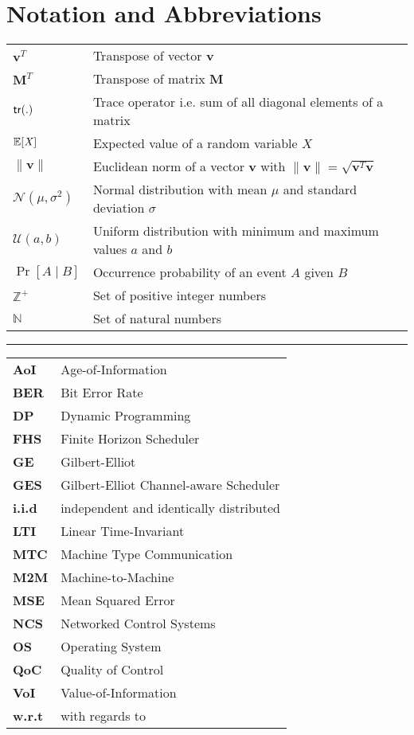 \chapter*{Notation and Abbreviations}

\begin{tabular}{p{2cm} l} 
$\boldsymbol{v}^T$ & Transpose of vector $\boldsymbol{v}$\\
$\boldsymbol{M}^T$ & Transpose of matrix $\boldsymbol{M}$\\
$\mathsf{tr}(.)$ & Trace operator i.e. sum of all diagonal elements of a matrix\\
$\mathbb{E}[\mathit{X}]$ & Expected value of a random variable $\mathit{X}$\\
$\|\boldsymbol{v}\|$ & Euclidean norm of a vector $\boldsymbol{v}$ with $\|\boldsymbol{v}\|=\sqrt{\boldsymbol{v} ^T\boldsymbol{v}}$\\
$\mathcal{N}(\mu,\sigma^2)$ & Normal distribution with mean $\mu$ and standard deviation $\sigma$\\
$\mathcal{U}(a,b)$ & Uniform distribution with minimum and maximum values $a$ and $b$\\
$\Pr\left[A \mid B \right]$ & Occurrence probability of an event $A$ given $B$\\
$\mathbb{Z}^+$ & Set of positive integer numbers\\
$\mathbb{N}$ & Set of natural numbers\\
\end{tabular}
\vspace{1cm}

\hrule
\vspace{1cm}
  
\begin{tabular}{>{\bfseries}p{2cm} l}
AoI & Age-of-Information\\
BER & Bit Error Rate\\
DP & Dynamic Programming\\
FHS & Finite Horizon Scheduler\\
GE & Gilbert-Elliot\\
GES & Gilbert-Elliot Channel-aware Scheduler\\
i.i.d & independent and identically distributed\\
LTI & Linear Time-Invariant\\
MTC & Machine Type Communication\\
M2M & Machine-to-Machine\\
MSE & Mean Squared Error\\
NCS & Networked Control Systems\\
OS & Operating System\\
QoC & Quality of Control\\
VoI & Value-of-Information\\
w.r.t & with regards to\\
\end{tabular}
